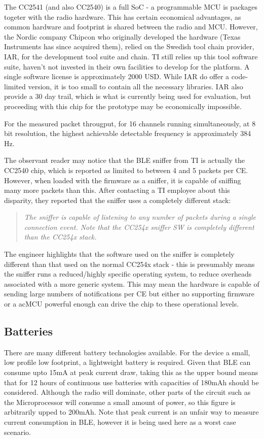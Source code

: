 \documentclass[]{article}
\begin{document}
The CC2541 (and also CC2540) is a full \ac{SoC} - a programmable \ac{MCU} is packages togeter with the radio hardware. This has certain economical advantages, as common hardware and footprint is shared between the radio and \ac{MCU}. However, the Nordic company Chipcon who originally developed the hardware (Texas Instruments has since acquired them), relied on the Swedish tool chain provider, IAR, for the development tool suite and chain. \ac{TI} still relies up this tool software suite, haven't not invested in their own facilities to develop for the platform. A single software license is approximately 2000 USD. While IAR do offer a code-limited version, it is too small to contain all the necessary libraries. IAR also provide a 30 day trail, which is what is currently being used for evaluation, but proceeding with this chip for the prototype may be economically impossible.

For the measured packet througput, for 16 channels running simultaneously, at 8 bit resolution, the highest achievable detectable frequency is approximately 384 Hz.

The observant reader may notice that the \ac{BLE} sniffer from \ac{TI} is actually the CC2540 chip, which is reported as limited to between 4 and 5 packets per \ac{CE}. However, when loaded with the firmware as a sniffer, it is capable of sniffing many more packets than this. After contacting a \ac{TI} employee about this disparity, they reported that the sniffer uses a completely different stack:

\begin{quote}\itshape The sniffer is capable of listening to any number of packets during a single connection event. Note that the CC254x sniffer SW is completely different than the CC254x stack.\end{quote}

 The engineer highlights that the software used on the sniffer is completely different than that used on the normal CC254x stack - this is presumably means the sniffer runs a reduced/highly specific operating system, to reduce overheads associated with a more generic system. This may mean the hardware is capable of sending large numbers of notifications per \ac{CE} but either no supporting firmware or a ac{MCU} powerful enough can drive the chip to these operational levels. 

\subsection{Batteries}
There are many different battery technologies available. For the device a small, low profile low footprint, a lightweight battery is required. Given that \ac{BLE} can consume upto 15mA at peak current draw, taking this as the upper bound means that for 12 hours of continuous use batteries with capacities of 180mAh should be considered. Although the radio will dominate, other parts of the circuit such as the Microprocessor will consume a small amount of power, so this figure is arbitrarily upped to 200mAh. Note that peak current is an unfair way to measure current consumption in \ac{BLE}, however it is being used here as a worst case scenario. 
\end{document}
